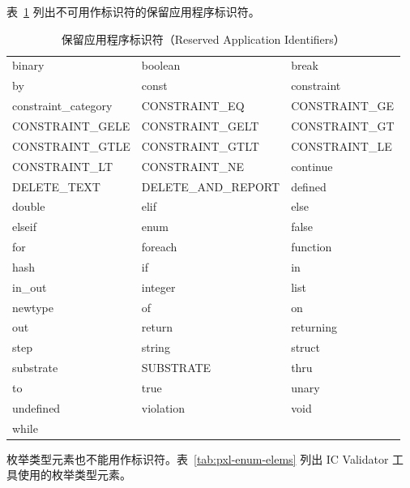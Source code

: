 表~\ref{tab:pxl-app-ids} 列出不可用作标识符的保留应用程序标识符。

\begin{longtable}{@{}>{\raggedright\arraybackslash\ttfamily}p{} >{\raggedright\arraybackslash\ttfamily}p{} >{\raggedright\arraybackslash\ttfamily}p{}@{}}
\caption{保留应用程序标识符（Reserved Application Identifiers）}\label{tab:pxl-app-ids}\\
\toprule
\endfirsthead
\endhead
\bottomrule
\endfoot
binary & boolean & break \\
by & const & constraint \\
constraint\_category & CONSTRAINT\_EQ & CONSTRAINT\_GE \\
CONSTRAINT\_GELE & CONSTRAINT\_GELT & CONSTRAINT\_GT \\
CONSTRAINT\_GTLE & CONSTRAINT\_GTLT & CONSTRAINT\_LE \\
CONSTRAINT\_LT & CONSTRAINT\_NE & continue \\
DELETE\_TEXT & DELETE\_AND\_REPORT & defined \\
double & elif & else \\
elseif & enum & false \\
for & foreach & function \\
hash & if & in \\
in\_out & integer & list \\
newtype & of & on \\
out & return & returning \\
step & string & struct \\
substrate & SUBSTRATE & thru \\
to & true & unary \\
undefined & violation & void \\
while &  &  \\
\end{longtable}

枚举类型元素也不能用作标识符。表~\ref{tab:pxl-enum-elems} 列出 IC Validator 工具使用的枚举类型元素。

